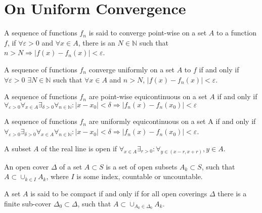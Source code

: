     \section{On Uniform Convergence}
        \begin{definition}
            A sequence of functions $f_n$ is said to converge
            point-wise on a set $A$ to a function $f$, if
            $\forall\varepsilon>0$ and $\forall x\in A$, there is
            an $N\in\mathbb{N}$ such that $n>N \Rightarrow
            |f(x)-f_n(x)|<\varepsilon$.
        \end{definition}
        \begin{definition}
            A sequence of functions $f_n$ converge uniformly on a
            set $A$ to $f$ if and only if $\forall \varepsilon>0$
            $\exists N\in\mathbb{N}$ such that $\forall x \in A$
            and $n>N$, $|f(x) -f_n(x)|<\varepsilon$.
        \end{definition}
        \begin{definition}
            A sequence of functions $f_n$ are point-wise
            equicontinuous on a set $A$ if and only if
            $\forall_{\varepsilon>0}\forall_{x\in A}
            \exists_{\delta>0}\forall_{n\in\mathbb{N}}:
            |x-x_0|<\delta\Rightarrow|f_{n}(x)-f_{n}(x_0)|<
            \varepsilon$
        \end{definition}
        \begin{definition}
            A sequence of functions $f_n$ are uniformly
            equicontinuous on a set A if and only if
            $\forall_{\varepsilon>0}\exists_{\delta>0}
            \forall_{x\in A}\forall_{n\in\mathbb{N}}:
            |x-x_{0}|<\delta\Rightarrow|f_{n}(x)-f_{n}(x_{0})|<
            \varepsilon$.
        \end{definition}
        \begin{definition}
            A subset $A$ of the real line is open if
            $\forall_{x\in A}\exists_{r>0}:
            \forall_{y\in (x-r,x+r)},y\in A$.
        \end{definition}
        \begin{definition}
            An open cover $\Delta$ of a set $A\subset S$ is a set
            of open subsets $A_k\subset S$, such that
            $A\subset\cup_{k\in I}A_{k}$, where $I$ is some
            index, countable or uncountable.
        \end{definition}
        \begin{definition}
            A set $A$ is said to be compact if and
            only if for all open coverings $\Delta$ there is
            a finite sub-cover $\Delta_0\subset \Delta$, such
            that $A\subset \cup_{A_k \in \Delta_0} A_k$.
        \end{definition}
